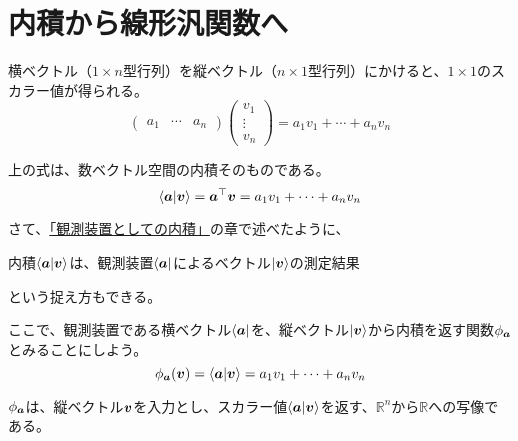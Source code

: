 \documentclass[../../../topic_linear-algebra]{subfiles}
\begin{document}
\sectionline
\section{内積から線形汎関数へ}\label{sec:inner-product-to-functional}

横ベクトル（$1 \times n$型行列）を縦ベクトル（$n \times 1$型行列）にかけると、$1 \times 1$のスカラー値が得られる。
\begin{equation*}
  \begin{pmatrix}
    a_1 & \cdots & a_n
  \end{pmatrix} \begin{pmatrix}
    v_1    \\
    \vdots \\
    v_n
  \end{pmatrix}
  = a_1 v_1 + \cdots + a_n v_n
\end{equation*}

上の式は、数ベクトル空間の内積そのものである。
\begin{equation*}
  \braket{\vb*{a}|\vb*{v}} = \vb*{a}^\top\vb*{v} = a_1 v_1 + \cdots + a_n v_n
\end{equation*}

\br

さて、\hyperref[sec:inner-product-as-observer]{「観測装置としての内積」}の章で述べたように、
\begin{emphabox}
  \begin{spacebox}
    \begin{center}
      内積$\braket{\vb*{a}|\vb*{v}}$は、観測装置$\bra{\vb*{a}}$によるベクトル$\ket{\vb*{v}}$の測定結果
    \end{center}
  \end{spacebox}
\end{emphabox}
という捉え方もできる。

\br

ここで、観測装置である横ベクトル$\bra{\vb*{a}}$を、縦ベクトル$\ket{\vb*{v}}$から内積を返す関数$\phi_{\vb*{a}}$とみることにしよう。
\begin{equation*}
  \phi_{\vb*{a}}(\vb*{v}) = \braket{\vb*{a}|\vb*{v}} = a_1 v_1 + \cdots + a_n v_n
\end{equation*}

$\phi_{\vb*{a}}$は、縦ベクトル$\vb*{v}$を入力とし、スカラー値$\braket{\vb*{a}|\vb*{v}}$を返す、$\mathbb{R}^n$から$\mathbb{R}$への写像である。
\end{document}
